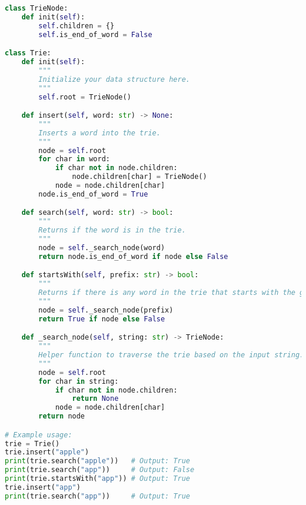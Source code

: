 \begin{fullwidth}
\begin{lstlisting}[language=Python]
class TrieNode:
    def init(self):
        self.children = {}
        self.is_end_of_word = False

class Trie:
    def init(self):
        """
        Initialize your data structure here.
        """
        self.root = TrieNode()

    def insert(self, word: str) -> None:
        """
        Inserts a word into the trie.
        """
        node = self.root
        for char in word:
            if char not in node.children:
                node.children[char] = TrieNode()
            node = node.children[char]
        node.is_end_of_word = True

    def search(self, word: str) -> bool:
        """
        Returns if the word is in the trie.
        """
        node = self._search_node(word)
        return node.is_end_of_word if node else False

    def startsWith(self, prefix: str) -> bool:
        """
        Returns if there is any word in the trie that starts with the given prefix.
        """
        node = self._search_node(prefix)
        return True if node else False

    def _search_node(self, string: str) -> TrieNode:
        """
        Helper function to traverse the trie based on the input string.
        """
        node = self.root
        for char in string:
            if char not in node.children:
                return None
            node = node.children[char]
        return node

# Example usage:
trie = Trie()
trie.insert("apple")
print(trie.search("apple"))   # Output: True
print(trie.search("app"))     # Output: False
print(trie.startsWith("app")) # Output: True
trie.insert("app")
print(trie.search("app"))     # Output: True
\end{lstlisting}
\end{fullwidth}

